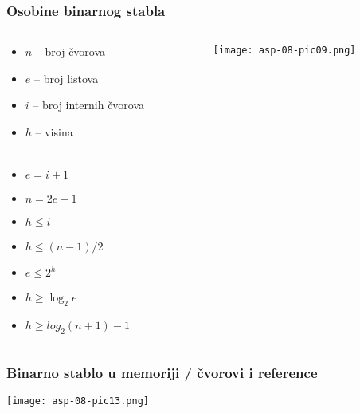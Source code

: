 \documentclass[compress,aspectratio=169]{beamer}
\begin{document}
\begin{frame}[fragile]
  \frametitle{Osobine binarnog stabla}
\begin{columns}
  \begin{column}[c]{6cm}
  \begin{itemize}
    \item $n$ -- broj čvorova
    \item $e$ -- broj listova
    \item $i$ -- broj internih čvorova
    \item $h$ -- visina \\ \ \\
    \item $e = i+1$
    \item $n = 2e-1$
    \item $h\leq i$
    \item $h\leq (n-1)/2$
    \item $e\leq 2^h$
    \item $h\geq \log_2 e$
    \item $h\geq log_2(n+1)-1$
  \end{itemize}
  \end{column}
  \begin{column}[c]{5cm}
  \begin{center}
    \texttt{[image: asp-08-pic09.png]}
  \end{center}
  \end{column}
\end{columns}
\end{frame}

\begin{frame}[fragile]
  \frametitle{Binarno stablo u memoriji / čvorovi i reference}
\begin{center}
  \texttt{[image: asp-08-pic13.png]}
\end{center}
\end{frame}
\end{document}
